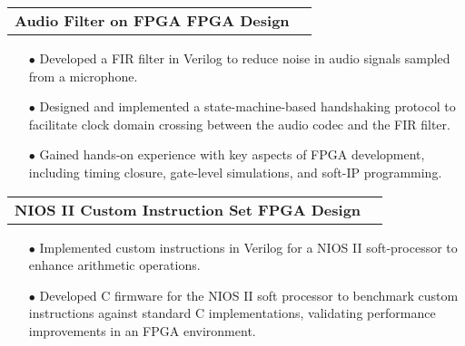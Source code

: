\documentclass[11pt]{article}
\makeatletter
\newcommand{\resumeSubheadingP}[2]{
  \vspace{-2pt}\item
    \begin{tabular*}{1.0\textwidth}[t]{l@{\extracolsep{\fill}}r}
       \textbf{{\large #1}}&{#2} \\
    \end{tabular*}\vspace{-1pt}
}
\makeatother
\begin{document}
\resumeSubheadingP
{Audio Filter on FPGA \textbar{ } FPGA Design}{ }
\begin{itemize}[leftmargin=0.3in]\setlength{\itemsep}{0pt}\setlength{\parskip}{0pt}\vspace{-0.2cm}
  \item[$\bullet$] Developed a FIR filter in Verilog to reduce noise in audio signals sampled from a microphone.
  \item[$\bullet$] Designed and implemented a state-machine-based handshaking protocol to facilitate clock domain crossing between the audio codec and the FIR filter.
  \item[$\bullet$] Gained hands-on experience with key aspects of FPGA development, including timing closure, gate-level simulations, and soft-IP programming.
\end{itemize}
\vspace{-0.3cm}

\resumeSubheadingP
{NIOS II Custom Instruction Set \textbar{ } FPGA Design}{}
\begin{itemize}[leftmargin=0.3in]\setlength{\itemsep}{0pt}\setlength{\parskip}{0pt}\vspace{-0.2cm}
  \item[$\bullet$] Implemented custom instructions in Verilog for a NIOS II soft-processor to enhance arithmetic operations.
  \item[$\bullet$] Developed C firmware for the NIOS II soft processor to benchmark custom instructions against standard C implementations, validating performance improvements in an FPGA environment.
\end{itemize}
\vspace{-0.2cm}


\end{document}

